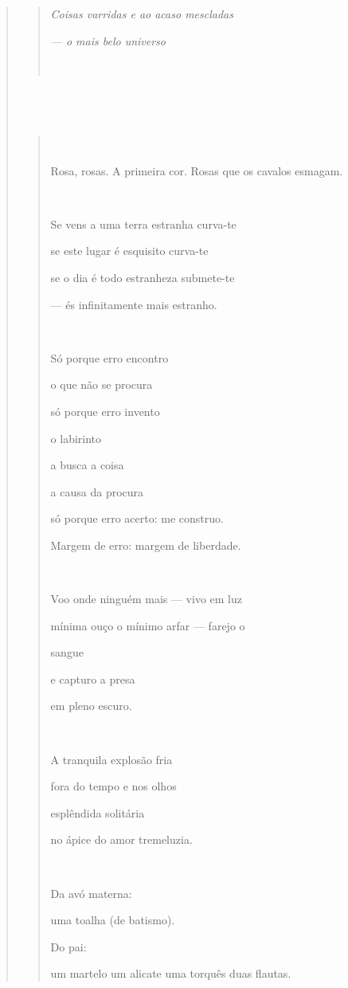 \begin{verse}
\begin{quote}
\emph{Coisas varridas e ao acaso mescladas}

\emph{--- o mais belo universo}


\end{quote}

\subsection{}\label{section-4}

\begin{quote}


Rosa, rosas. A primeira cor. Rosas que os cavalos esmagam.



Se vens a uma terra estranha curva-te

se este lugar é esquisito curva-te

se o dia é todo estranheza submete-te

--- és infinitamente mais estranho.



Só porque erro encontro

o que não se procura

só porque erro invento

o labirinto

a busca a coisa

a causa da procura

só porque erro acerto: me construo.

Margem de erro: margem de liberdade.



Voo onde ninguém mais --- vivo em luz

mínima ouço o mínimo arfar --- farejo o

sangue

e capturo a presa

em pleno escuro.



A tranquila explosão fria

fora do tempo e nos olhos

esplêndida solitária

no ápice do amor tremeluzia.



Da avó materna:

uma toalha (de batismo).

Do pai:

um martelo um alicate uma torquês duas flautas.


\end{quote}
\end{verse}
